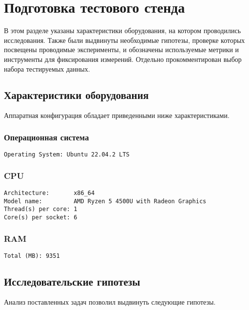 
\section{Подготовка тестового стенда}
\noindent В этом разделе указаны характеристики оборудования, на котором проводились исследования. Также были выдвинуты необходимые гипотезы, проверке которых посвещены проводимые эксперименты, и обозначены используемые метрики и инструменты для фиксирования измерений. Отдельно прокомментирован выбор набора тестируемых данных.



\subsection{Характеристики оборудования}
\noindent Аппаратная конфигурация обладает приведенными ниже характеристиками.
\subsubsection*{Операционная система}

\begin{verbatim}
Operating System: Ubuntu 22.04.2 LTS
\end{verbatim}

\subsubsection*{CPU}
\begin{verbatim}
Architecture:       x86_64
Model name:         AMD Ryzen 5 4500U with Radeon Graphics
Thread(s) per core: 1
Core(s) per socket: 6
\end{verbatim}

\subsubsection*{RAM}
\begin{verbatim}
Total (MB): 9351
\end{verbatim}



\subsection{Исследовательские гипотезы}
\noindent Анализ поставленных задач позволил выдвинуть следующие гипотезы.


